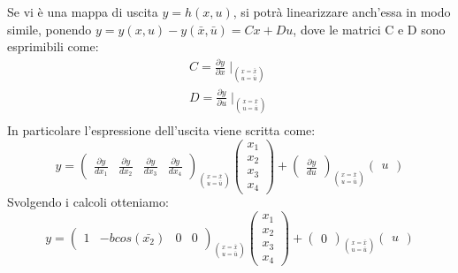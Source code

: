 Se vi è una mappa di uscita $y=h(x,u)$, si potrà linearizzare anch’essa in modo simile, ponendo $y =y(x,u) - y(\bar x, \bar u)=Cx+Du$, dove le matrici C e D sono esprimibili come:
\begin{displaymath}
\begin{array}{l}
C=\frac{\partial y}{\partial x}\mid_{\binom{x=\bar{x}}{u=\bar{u}}} \\
D=\frac{\partial y}{\partial u}\mid_{\binom{x=\bar{x}}{u=\bar{u}}} \\
\end{array}
\end{displaymath}
In particolare l'espressione dell'uscita viene scritta come:
\begin{displaymath}
y=\left(\begin{array}{cccc}
\frac{\partial y}{dx_{1}} & \frac{\partial y}{dx_{2}} & \frac{\partial y}{dx_{3}} & \frac{\partial y}{dx_{4}}\end{array}\right)_{\binom{x=\bar{x}}{u=\bar{u}}}\left(\begin{array}{c}
x_{1}\\
x_{2}\\
x_{3}\\
x_{4}
\end{array}\right)+\left(\begin{array}{cc}
\frac{\partial y}{du}\end{array}\right)_{\binom{x=\bar{x}}{u=\bar{u}}}\left(\begin{array}{c}
u
\end{array}\right)
\end{displaymath}
Svolgendo i calcoli otteniamo:
\begin{displaymath}
y=\left(\begin{array}{cccc}
1 & -bcos(\bar{x_{2}}) & 0 & 0\end{array}\right)_{\binom{x=\bar{x}}{u=\bar{u}}}\left(\begin{array}{c}
x_{1}\\
x_{2}\\
x_{3}\\
x_{4}
\end{array}\right)+\left(\begin{array}{cc}
0 \end{array}\right)_{\binom{x=\bar{x}}{u=\bar{u}}}\left(\begin{array}{c}
u
\end{array}\right)
\end{displaymath}

